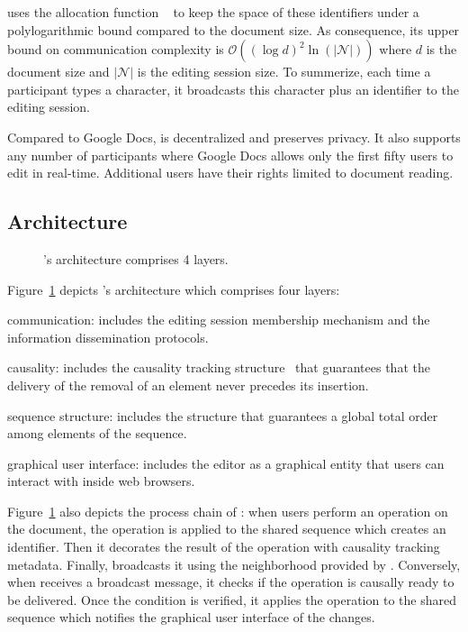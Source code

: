 
\CRATE uses the allocation function \LSEQ~\cite{nedelec2013lseq} to keep the
space of these identifiers under a polylogarithmic bound compared to the
document size. As consequence, its upper bound on communication complexity is
$\mathcal{O}((\log d)^2\ln(|\mathcal{N}|))$ where $d$ is the document size and
$|\mathcal{N}|$ is the editing session size. To summerize, each time a
participant types a character, it broadcasts this character plus an identifier
to the editing session.

Compared to Google Docs, \CRATE is decentralized and preserves
privacy. It also supports any number of participants where Google Docs
allows only the first fifty users to edit in real-time. Additional
users have their rights limited to document reading.

\subsection{Architecture}

\begin{figure}
  \centering
  
  \caption{\label{fig:architecture}\CRATE's architecture comprises 4
    layers.}
\end{figure}

Figure~\ref{fig:architecture} depicts \CRATE's architecture which comprises four
layers:
\begin{inparaenum}[(i)]
\item communication: includes the editing session membership mechanism and the
  information dissemination protocols.
\item causality: includes the causality tracking
  structure~\cite{malkhi2007concise} that guarantees that the delivery of the
  removal of an element never precedes its insertion.
\item sequence structure: includes the structure that guarantees a global
  total order among elements of the sequence.
\item graphical user interface: includes the editor as a graphical entity that
  users can interact with inside web browsers.
\end{inparaenum}
Figure~\ref{fig:architecture} also depicts the process chain of \CRATE: when
users perform an operation on the document, the operation is applied to the
shared sequence which creates an \LSEQ identifier. Then it decorates the result
of the operation with causality tracking metadata. Finally, \CRATE broadcasts it
using the neighborhood provided by \SPRAY.  Conversely, when \CRATE receives a
broadcast message, it checks if the operation is causally ready to be
delivered. Once the condition is verified, it applies the operation to the
shared sequence which notifies the graphical user interface of the changes.

